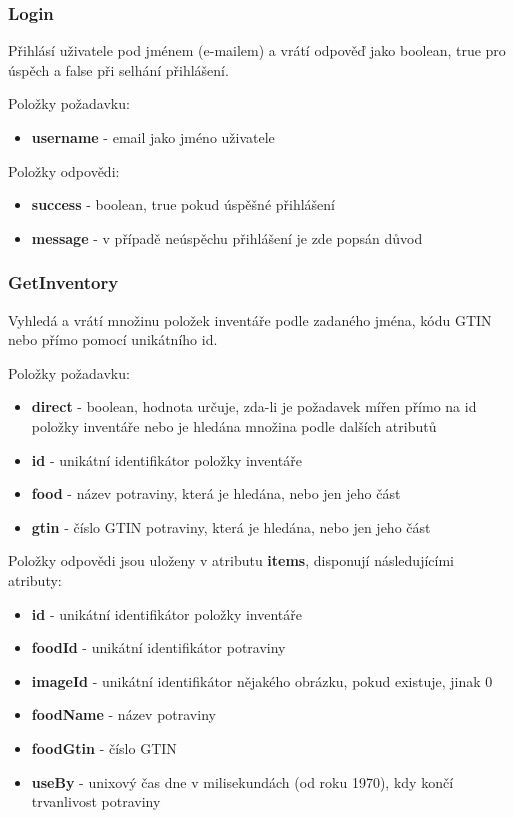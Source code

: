\documentclass[thesis=B,czech]{FITthesis}[2013/10/20]
\begin{document}
\subsubsection{Login}
Přihlásí uživatele pod jménem (e-mailem) a vrátí odpověď jako boolean, true pro úspěch a false při selhání přihlášení.

Položky požadavku:
\begin{itemize}
  \item \textbf{username} - email jako jméno uživatele
\end{itemize}

Položky odpovědi:
\begin{itemize}
  \item \textbf{success} - boolean, true pokud úspěšné přihlášení
  \item \textbf{message} - v případě neúspěchu přihlášení je zde popsán důvod
\end{itemize}

\subsubsection{GetInventory}
Vyhledá a vrátí množinu položek inventáře podle zadaného jména, kódu GTIN nebo přímo pomocí unikátního id.

Položky požadavku:
\begin{itemize}
  \item \textbf{direct} - boolean, hodnota určuje, zda-li je požadavek mířen přímo na id položky inventáře nebo je hledána množina podle dalších atributů
  \item \textbf{id} - unikátní identifikátor položky inventáře
  \item \textbf{food} - název potraviny, která je hledána, nebo jen jeho část
  \item \textbf{gtin} - číslo GTIN potraviny, která je hledána, nebo jen jeho část
\end{itemize}

Položky odpovědi jsou uloženy v atributu \textbf{items}, disponují následujícími atributy:
\begin{itemize}
  \item \textbf{id} - unikátní identifikátor položky inventáře
  \item \textbf{foodId} - unikátní identifikátor potraviny
  \item \textbf{imageId} - unikátní identifikátor nějakého obrázku, pokud existuje, jinak 0
  \item \textbf{foodName} - název potraviny
  \item \textbf{foodGtin} - číslo GTIN
  \item \textbf{useBy} - unixový čas dne v milisekundách (od roku 1970), kdy končí trvanlivost potraviny
\end{itemize}
\end{document}
